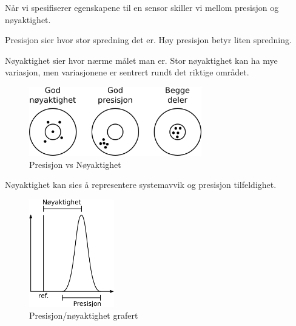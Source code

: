 Når vi spesifiserer egenskapene til en sensor skiller vi mellom presisjon
og nøyaktighet.

Presisjon sier hvor stor spredning det er.
Høy presisjon betyr liten spredning.

Nøyaktighet sier hvor nærme målet man er.
Stor nøyaktighet kan ha mye variasjon, men variasjonene er sentrert rundt
det riktige området.

\begin{figure}[H]
  \centering
  \includegraphics[width=0.67\textwidth]{./img/presisjon}
  \caption{Presisjon vs Nøyaktighet}
\end{figure}

Nøyaktighet kan sies å representere systemavvik og
presisjon tilfeldighet.

\begin{figure}[H]
  \centering
  \includegraphics[width=0.33\textwidth]{./img/avvik}
  \caption{Presisjon/nøyaktighet grafert}
\end{figure}
